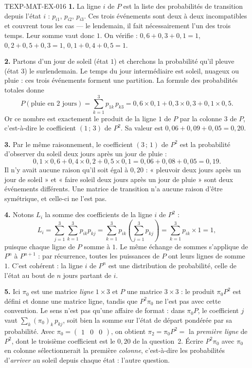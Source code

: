 \begin{corrige}{TEXP-MAT-EX-016}
\textbf{1.} La ligne $i$ de $P$ est la liste des probabilités de transition
depuis l'état $i$ : $p_{i1}$, $p_{i2}$, $p_{i3}$. Ces trois événements sont deux à
deux incompatibles et couvrent tous les cas — le lendemain, il fait
nécessairement l'un des trois temps. Leur somme vaut donc $1$. On vérifie :
$0{,}6+0{,}3+0{,}1=1$, $0{,}2+0{,}5+0{,}3=1$, $0{,}1+0{,}4+0{,}5=1$.

\textbf{2.} Partons d'un jour de soleil (état $1$) et cherchons la probabilité
qu'il pleuve (état $3$) le surlendemain. Le temps du jour intermédiaire est
soleil, nuageux ou pluie : ces trois événements forment une partition. La formule
des probabilités totales donne
\[
  P(\text{pluie en }2\text{ jours})=\sum_{k=1}^{3} p_{1k}\,p_{k3}
  =0{,}6\times0{,}1+0{,}3\times0{,}3+0{,}1\times0{,}5.
\]
Or ce nombre est exactement le produit de la ligne $1$ de $P$ par la colonne $3$
de $P$, c'est-à-dire le coefficient $(1\,;\,3)$ de $P^2$. Sa valeur est
$0{,}06+0{,}09+0{,}05=0{,}20$.

\textbf{3.} Par le même raisonnement, le coefficient $(3\,;\,1)$ de $P^2$ est la
probabilité d'observer du soleil deux jours après un jour de pluie :
\[
  0{,}1\times0{,}6+0{,}4\times0{,}2+0{,}5\times0{,}1=0{,}06+0{,}08+0{,}05=0{,}19.
\]
Il n'y avait aucune raison qu'il soit égal à $0{,}20$ : « pleuvoir deux jours
après un jour de soleil » et « faire soleil deux jours après un jour de pluie »
sont deux événements différents. Une matrice de transition n'a aucune raison
d'être symétrique, et celle-ci ne l'est pas.

\textbf{4.} Notons $L_i$ la somme des coefficients de la ligne $i$ de $P^2$ :
\[
  L_i=\sum_{j=1}^{3}\sum_{k=1}^{3}p_{ik}p_{kj}
  =\sum_{k=1}^{3}p_{ik}\left(\sum_{j=1}^{3}p_{kj}\right)
  =\sum_{k=1}^{3}p_{ik}\times 1=1,
\]
puisque chaque ligne de $P$ somme à $1$. Le même échange de sommes s'applique de
$P^{n}$ à $P^{n+1}$ : par récurrence, toutes les puissances de $P$ ont leurs
lignes de somme $1$. C'est cohérent : la ligne $i$ de $P^n$ est une distribution
de probabilité, celle de l'état au bout de $n$ jours partant de $i$.

\textbf{5.} Ici $\pi_0$ est une matrice \emph{ligne} $1\times 3$ et $P$ une
matrice $3\times 3$ : le produit $\pi_0P^2$ est défini et donne une matrice
ligne, tandis que $P^2\pi_0$ ne l'est pas avec cette convention. Le sens n'est pas
qu'une affaire de format : dans $\pi_0 P$, le coefficient $j$ vaut
$\sum_k (\pi_0)_k\,p_{kj}$, soit bien la somme sur l'état de départ pondérée par
sa probabilité. Avec $\pi_0=\begin{pmatrix}1&0&0\end{pmatrix}$, on obtient
$\pi_2=\pi_0P^2=$ la \emph{première ligne} de $P^2$, dont le troisième
coefficient est le $0{,}20$ de la question~2. Écrire $P^2\pi_0$ avec $\pi_0$ en
colonne sélectionnerait la première \emph{colonne}, c'est-à-dire les probabilités
d'\emph{arriver} au soleil depuis chaque état : l'autre question.
\end{corrige}
